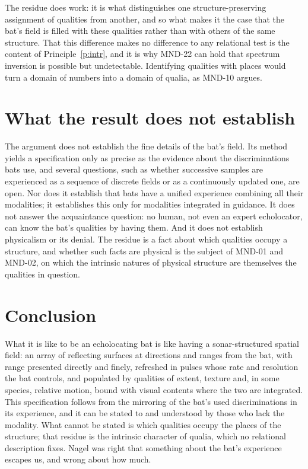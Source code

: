 \documentclass{situationist-preprint}
\begin{document}
\begin{reply}
The residue does work: it is what distinguishes one structure-preserving assignment of qualities from another, and so what makes it the case that the bat's field is filled with these qualities rather than with others of the same structure. That this difference makes no difference to any relational test is the content of Principle~\ref{p:intr}, and it is why MND-22 can hold that spectrum inversion is possible but undetectable. Identifying qualities with places would turn a domain of numbers into a domain of qualia, as MND-10 argues.
\end{reply}

\section{What the result does not establish}\label{s:limits}

The argument does not establish the fine details of the bat's field. Its method yields a specification only as precise as the evidence about the discriminations bats use, and several questions, such as whether successive samples are experienced as a sequence of discrete fields or as a continuously updated one, are open. Nor does it establish that bats have a unified experience combining all their modalities; it establishes this only for modalities integrated in guidance. It does not answer the acquaintance question: no human, not even an expert echolocator, can know the bat's qualities by having them. And it does not establish physicalism or its denial. The residue is a fact about which qualities occupy a structure, and whether such facts are physical is the subject of MND-01 and MND-02, on which the intrinsic natures of physical structure are themselves the qualities in question.

\section{Conclusion}\label{s:conclusion}

What it is like to be an echolocating bat is like having a sonar-structured spatial field: an array of reflecting surfaces at directions and ranges from the bat, with range presented directly and finely, refreshed in pulses whose rate and resolution the bat controls, and populated by qualities of extent, texture and, in some species, relative motion, bound with visual contents where the two are integrated. This specification follows from the mirroring of the bat's used discriminations in its experience, and it can be stated to and understood by those who lack the modality. What cannot be stated is which qualities occupy the places of the structure; that residue is the intrinsic character of qualia, which no relational description fixes. Nagel was right that something about the bat's experience escapes us, and wrong about how much.
\end{document}
